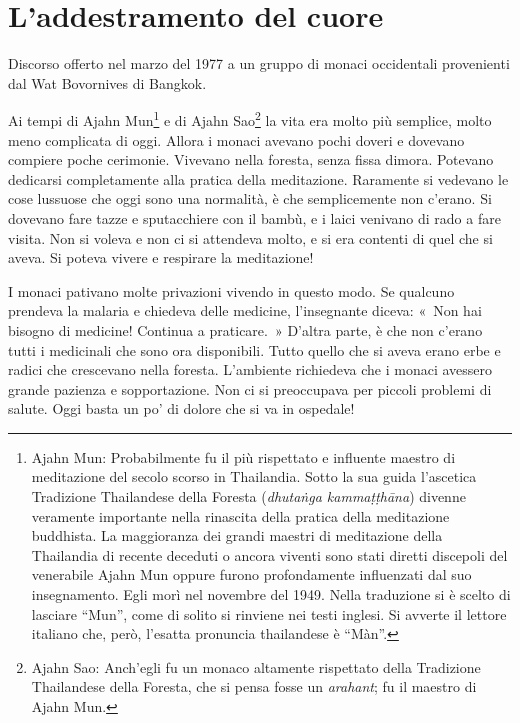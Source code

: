 \chapter{L'addestramento del cuore}

\begin{openingQuote}
  \centering

  Discorso offerto nel marzo del 1977 a un gruppo di monaci occidentali
  provenienti dal Wat Bovornives di Bangkok.
\end{openingQuote}

Ai tempi di Ajahn Mun\footnote{Ajahn Mun: Probabilmente fu il più
  rispettato e influente maestro di meditazione del secolo scorso in
  Thailandia. Sotto la sua guida l'ascetica Tradizione Thailandese della
  Foresta (\emph{dhutaṅga kammaṭṭhāna}) divenne veramente importante
  nella rinascita della pratica della meditazione buddhista. La
  maggioranza dei grandi maestri di meditazione della Thailandia di
  recente deceduti o ancora viventi sono stati diretti discepoli del
  venerabile Ajahn Mun oppure furono profondamente influenzati dal suo
  insegnamento. Egli morì nel novembre del 1949. Nella traduzione si è
  scelto di lasciare ``Mun'', come di solito si rinviene nei testi
  inglesi. Si avverte il lettore italiano che, però, l'esatta pronuncia
  thailandese è ``Màn''.} e di Ajahn Sao\footnote{Ajahn Sao: Anch'egli
  fu un monaco altamente rispettato della Tradizione Thailandese della
  Foresta, che si pensa fosse un \emph{arahant}; fu il maestro di Ajahn
  Mun.} la vita era molto più semplice, molto meno complicata di oggi.
Allora i monaci avevano pochi doveri e dovevano compiere poche
cerimonie. Vivevano nella foresta, senza fissa dimora. Potevano
dedicarsi completamente alla pratica della meditazione. Raramente si
vedevano le cose lussuose che oggi sono una normalità, è che
semplicemente non c'erano. Si dovevano fare tazze e sputacchiere con il
bambù, e i laici venivano di rado a fare visita. Non si voleva e non ci
si attendeva molto, e si era contenti di quel che si aveva. Si poteva
vivere e respirare la meditazione!

I monaci pativano molte privazioni vivendo in questo modo. Se qualcuno
prendeva la malaria e chiedeva delle medicine, l'insegnante diceva:
«~Non hai bisogno di medicine! Continua a praticare.~» D'altra parte, è
che non c'erano tutti i medicinali che sono ora disponibili. Tutto
quello che si aveva erano erbe e radici che crescevano nella foresta.
L'ambiente richiedeva che i monaci avessero grande pazienza e
sopportazione. Non ci si preoccupava per piccoli problemi di salute.
Oggi basta un po' di dolore che si va in ospedale!

